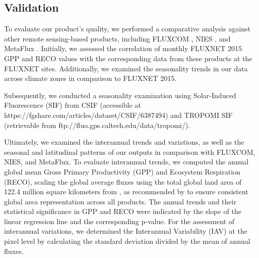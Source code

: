 \subsection{Validation}
To evaluate our product's quality, we performed a comparative analysis against other remote sensing-based products, including FLUXCOM \citep{jung2019fluxcom}, NIES \citep{zeng2020global}, and MetaFlux \citep{nathaniel2023metaflux}. Initially, we assessed the correlation of monthly FLUXNET 2015 GPP and RECO values with the corresponding data from these products at the FLUXNET sites. Additionally, we examined the seasonality trends in our data across climate zones in comparison to FLUXNET 2015. \par
Subsequently, we conducted a seasonality examination using Solar-Induced Fluorescence (SIF) from CSIF \citep{zhang2018global} (accessible at https://fgshare.com/articles/dataset/CSIF/6387494) and TROPOMI SIF \citep{kohler2018global} (retrievable from ftp://fluo.gps.caltech.edu/data/tropomi/).\par

Ultimately, we examined the interannual trends and variations, as well as the seasonal and latitudinal patterns of our outputs in comparison with FLUXCOM, NIES, and MetaFlux. To evaluate interannual trends, we computed the annual global mean Gross Primary Productivity (GPP) and Ecosystem Respiration (RECO), scaling the global average fluxes using the total global land area of 122.4 million square kilometers from \citep{friedl2010modis}, as recommended by \citep{jung2020scaling} to ensure consistent global area representation across all products. The annual trends and their statistical significance in GPP and RECO were indicated by the slope of the linear regression line and the corresponding p-value. For the assessment of interannual variations, we determined the Interannual Variability (IAV) at the pixel level by calculating the standard deviation divided by the mean of annual fluxes.\par


